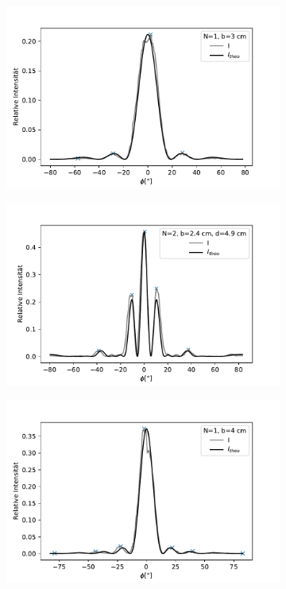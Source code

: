 \documentclass[12pt,a4paper]{article}
\begin{document}
\begin{figure}[H]
	\centering
	\begin{subfigure}{.5\textwidth}
		\centering
		\includegraphics[width=0.9\linewidth]{Rohdaten/Images/einzelspalt_3_3}
	\end{subfigure}%
	\begin{subfigure}{.5\textwidth}
		\centering
		\includegraphics[width=0.9\linewidth]{Rohdaten/Images/doppelspalt_2}
	\end{subfigure}
	\begin{subfigure}{.5\textwidth}
		\centering
		\includegraphics[width=0.9\linewidth]{Rohdaten/Images/einzelspalt_4_3}

\end{subfigure}
\end{figure}
\end{document}
